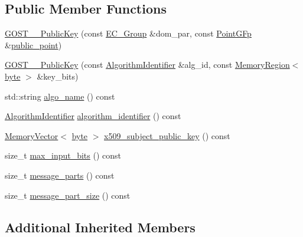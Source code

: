 \subsection*{Public Member Functions}
\begin{DoxyCompactItemize}
\item 
\hyperlink{classBotan_1_1GOST__3410__PublicKey_a8c041e63e41dde3bf663a6c2c7399c0d}{G\-O\-S\-T\-\_\-\_\-\-Public\-Key} (const \hyperlink{classBotan_1_1EC__Group}{E\-C\-\_\-\-Group} \&dom\-\_\-par, const \hyperlink{classBotan_1_1PointGFp}{Point\-G\-Fp} \&\hyperlink{classBotan_1_1EC__PublicKey_aaa811accdc280b77c1904bbbd819a1f7}{public\-\_\-point})
\item 
\hyperlink{classBotan_1_1GOST__3410__PublicKey_a190d972ba3a77a1273745eccff3e479e}{G\-O\-S\-T\-\_\-\_\-\-Public\-Key} (const \hyperlink{classBotan_1_1AlgorithmIdentifier}{Algorithm\-Identifier} \&alg\-\_\-id, const \hyperlink{classBotan_1_1MemoryRegion}{Memory\-Region}$<$ \hyperlink{namespaceBotan_a7d793989d801281df48c6b19616b8b84}{byte} $>$ \&key\-\_\-bits)
\item 
std\-::string \hyperlink{classBotan_1_1GOST__3410__PublicKey_a55f80444f2a6a35ac018a7d3da795552}{algo\-\_\-name} () const 
\item 
\hyperlink{classBotan_1_1AlgorithmIdentifier}{Algorithm\-Identifier} \hyperlink{classBotan_1_1GOST__3410__PublicKey_a501b3559235caf046812b114aeea4835}{algorithm\-\_\-identifier} () const 
\item 
\hyperlink{classBotan_1_1MemoryVector}{Memory\-Vector}$<$ \hyperlink{namespaceBotan_a7d793989d801281df48c6b19616b8b84}{byte} $>$ \hyperlink{classBotan_1_1GOST__3410__PublicKey_a1519551b4d12ef7bbcc6d486a17823d1}{x509\-\_\-subject\-\_\-public\-\_\-key} () const 
\item 
size\-\_\-t \hyperlink{classBotan_1_1GOST__3410__PublicKey_aaea9986ebd6e3472d25614eac3b3ae81}{max\-\_\-input\-\_\-bits} () const 
\item 
size\-\_\-t \hyperlink{classBotan_1_1GOST__3410__PublicKey_ab0de8f3f628debe10dcc898f10425f75}{message\-\_\-parts} () const 
\item 
size\-\_\-t \hyperlink{classBotan_1_1GOST__3410__PublicKey_a29a4c03389ea0efbd3643be19d6564a8}{message\-\_\-part\-\_\-size} () const 
\end{DoxyCompactItemize}
\subsection*{Additional Inherited Members}


